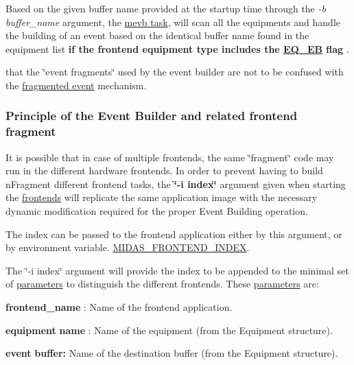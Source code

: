 Based on the given buffer name provided at the startup time through the {\itshape  -\/b buffer\_\-name \/} argument, the \hyperlink{FE_Event_Builder_FE_mevb_utility}{mevb task}, will scan all the equipments and handle the building of an event based on the identical buffer name found in the equipment list {\bfseries  if the frontend equipment type includes the \hyperlink{FE_table_FE_tbl_EqEb}{EQ\_\-EB} flag }.

that the \char`\"{}event fragments\char`\"{} used by the event builder are not to be confused with the \hyperlink{FE_eq_event_routines_FE_fragmented_event}{fragmented event} mechanism.

\label{FE_Event_Builder_idx_event_fragment}
\hypertarget{FE_Event_Builder_idx_event_fragment}{}
 \hypertarget{FE_Event_Builder_FE_principle_eb}{}\subsubsection{Principle of the Event Builder and related frontend fragment}\label{FE_Event_Builder_FE_principle_eb}
It is possible that in case of multiple frontends, the same \char`\"{}fragment\char`\"{} code may run in the different hardware frontends. In order to prevent having to build nFragment different frontend tasks, the {\bfseries  \char`\"{}-\/i index\char`\"{} } argument given when starting the \hyperlink{FrontendOperation_FE_frontend_utility}{frontends} will replicate the same application image with the necessary dynamic modification required for the proper Event Building operation.

The index can be passed to the frontend application either by this argument, or by environment variable. \hyperlink{BuildingOptions_BO_MIDAS_FRONTEND_INDEX}{MIDAS\_\-FRONTEND\_\-INDEX}.

The \char`\"{}-\/i index\char`\"{} argument will provide the index to be appended to the minimal set of \hyperlink{structparameters}{parameters} to distinguish the different frontends. These \hyperlink{structparameters}{parameters} are:
\begin{DoxyItemize}
\item {\bfseries frontend\_\-name} : Name of the frontend application.
\item {\bfseries equipment} {\bfseries name} : Name of the equipment (from the Equipment structure).
\item {\bfseries event} {\bfseries buffer:} Name of the destination buffer (from the Equipment structure).
\end{DoxyItemize}

